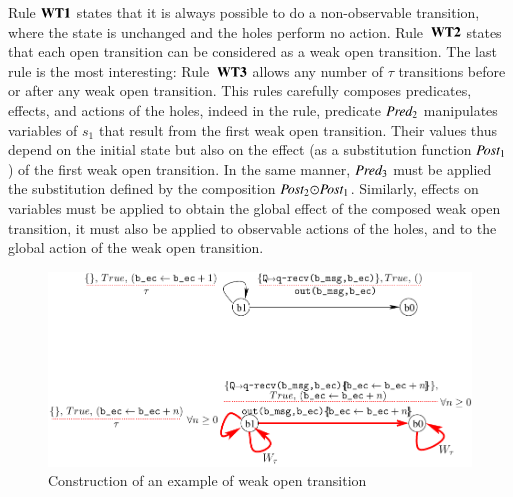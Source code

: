\documentclass{elsarticle}
\newcommand{\shortodot}{\!\odot\!}
\begin{document}
Rule $\textbf{WT1}$ states that it is always possible to do a non-observable transition, where the state is unchanged and the holes perform no action. Rule~$\textbf{WT2}$ states that each open transition can be considered as a weak open transition. The last rule is the most interesting:  Rule~$\textbf{WT3}$ allows any number of $\tau$ transitions before or after any weak open transition. This rules carefully composes predicates, effects, and actions of the holes, indeed in the rule, predicate $\Pred_2$ manipulates variables of $s_1$ that result from the first weak open transition. Their values thus depend on the initial state but also on the effect (as a substitution function $\Post_1$) of the first weak open transition. In the same manner, $\Pred_3$ must be applied the substitution defined by the composition $\Post_2\shortodot\Post_1$. Similarly, effects on variables must be applied to obtain the global effect of the composed weak open transition, it must also be applied to observable actions of the holes, and to the global action of the weak open transition.



\begin{figure}[ht]
   \centerline{\includegraphics[width=\linewidth]{XFIG/WOT2-result}}
  \caption{Construction of an example of weak open transition}
   \label{WOT2}
\end{figure}
\end{document}
